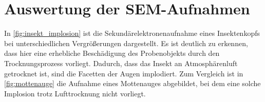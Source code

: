 \section{Auswertung der  SEM-Aufnahmen}




In \cref{fig:insekt_implosion} ist die Sekundärelektronenaufnahme eines Insektenkopfs bei unterschiedlichen Vergrößerungen dargestellt.
Es ist deutlich zu erkennen, dass hier eine erhebliche Beschädigung des Probenobjekts durch den Trocknungsprozess vorliegt.
Dadurch, dass das Insekt an Atmosphärenluft getrocknet ist, sind die Facetten der Augen implodiert.
Zum Vergleich ist in \cref{fig:mottenauge} die Aufnahme eines Mottenauges abgebildet, bei dem eine solche Implosion trotz Lufttrocknung nicht vorliegt.



